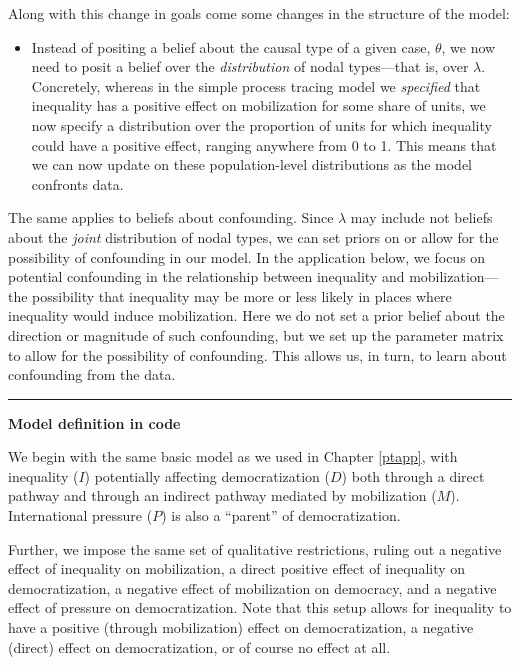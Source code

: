 \documentclass[12pt,]{book}
\providecommand{\tightlist}{%
  \setlength{\itemsep}{0pt}\setlength{\parskip}{0pt}}
\begin{document}
Along with this change in goals come some changes in the structure of the model:

\begin{itemize}
\tightlist
\item
  Instead of positing a belief about the causal type of a given case, \(\theta\), we now need to posit a belief over the \emph{distribution} of nodal types---that is, over \(\lambda\). Concretely, whereas in the simple process tracing model we \emph{specified} that inequality has a positive effect on mobilization for some share of units, we now specify a distribution over the proportion of units for which inequality could have a positive effect, ranging anywhere from 0 to 1. This means that we can now update on these population-level distributions as the model confronts data.
\end{itemize}

The same applies to beliefs about confounding. Since \(\lambda\) may include not beliefs about the \emph{joint} distribution of nodal types, we can set priors on or allow for the possibility of confounding in our model. In the application below, we focus on potential confounding in the relationship between inequality and mobilization---the possibility that inequality may be more or less likely in places where inequality would induce mobilization. Here we do not set a prior belief about the direction or magnitude of such confounding, but we set up the parameter matrix to allow for the possibility of confounding. This allows us, in turn, to learn about confounding from the data.

\begin{center}\rule{0.5\linewidth}{\linethickness}\end{center}

\textbf{Model definition in code}

We begin with the same basic model as we used in Chapter \ref{ptapp}, with inequality (\(I\)) potentially affecting democratization (\(D\)) both through a direct pathway and through an indirect pathway mediated by mobilization (\(M\)). International pressure (\(P\)) is also a ``parent'' of democratization.

Further, we impose the same set of qualitative restrictions, ruling out a negative effect of inequality on mobilization, a direct positive effect of inequality on democratization, a negative effect of mobilization on democracy, and a negative effect of pressure on democratization. Note that this setup allows for inequality to have a positive (through mobilization) effect on democratization, a negative (direct) effect on democratization, or of course no effect at all.
\end{document}
